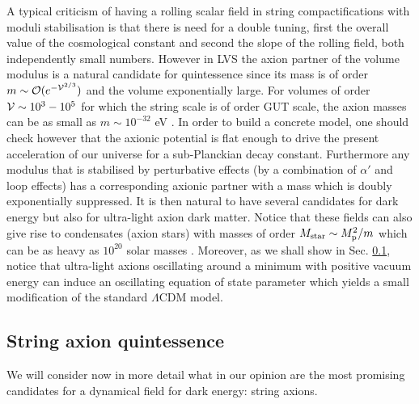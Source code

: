 \documentclass[11pt,a4paper]{article}
\newcommand{\vo}{\mathcal{V}}
\def\vo{{{\cal{V}}}}
\newcommand{\mc}{\mathcal}
\begin{document}
\begin{itemize}
A typical criticism of having a rolling scalar field in string compactifications with moduli stabilisation is that there is need for a double tuning, first the overall value of the cosmological constant and second the slope of the rolling field, both independently small numbers. However in LVS the axion partner of the volume modulus is a natural candidate for quintessence since its mass is of order $m\sim \mc{O}(e^{-\vo^{2/3}})$ and the volume exponentially large. For volumes of order $\vo\sim 10^3-10^5$ for which the string scale is of order GUT scale, the axion masses can be as small as $m\sim 10^{-32}$ eV  \cite{us}. In order to build a concrete model, one should check however that the axionic potential is flat enough to drive the present acceleration of our universe for a sub-Planckian decay constant. Furthermore any modulus that is stabilised by perturbative effects (by a combination of $\alpha'$ and loop effects) has a corresponding axionic partner with a mass which is doubly exponentially suppressed. It is then natural to have several candidates for dark energy but also for ultra-light axion dark matter. Notice that these fields can also give rise to condensates (axion stars) with masses of order $M_{\rm star}\sim M_{\rm p}^2/m$ which can be as heavy as $10^{20}$ solar masses \cite{Hui:2016ltb, Marsh:2015xka, Krippendorf:2018tei}. Moreover, as we shall show in Sec. \ref{sec:LowRedshift}, notice that ultra-light axions oscillating around a minimum with positive vacuum energy can induce an oscillating equation of state parameter which yields a small modification of the standard $\Lambda$CDM model.



\subsection{String axion quintessence}
\label{sec:LowRedshift}

We will consider now in more detail what in our opinion are the most promising candidates for a dynamical field for dark energy: string axions.


\end{itemize}
\end{document}

